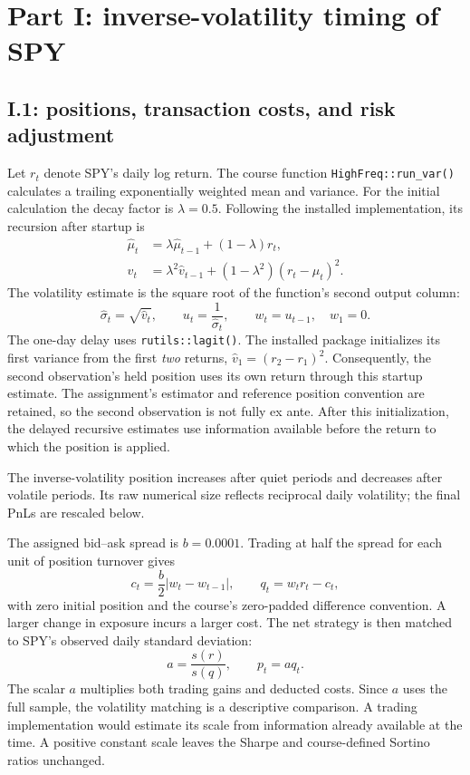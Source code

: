 \documentclass[11pt,letterpaper]{article}
\begin{document}
\section{Part I: inverse-volatility timing of SPY}
\subsection{I.1: positions, transaction costs, and risk adjustment}
Let $r_t$ denote SPY's daily log return. The course function
\texttt{HighFreq::run\_var()} calculates a trailing exponentially weighted
mean and variance. For the initial calculation the decay factor is
$\lambda=0.5$. Following the installed implementation, its recursion after
startup is
\begin{align}
\widehat\mu_t&=\lambda\widehat\mu_{t-1}+(1-\lambda)r_t,\\
\widehat v_t&=\lambda^2\widehat v_{t-1}
 +(1-\lambda^2)(r_t-\widehat\mu_t)^2.
\end{align}
The volatility estimate is the square root of the function's second output
column:
\begin{equation}
\widehat\sigma_t=\sqrt{\widehat v_t},\qquad
u_t=\frac{1}{\widehat\sigma_t},\qquad
w_t=u_{t-1},\quad w_1=0.
\label{eq:volposition}
\end{equation}
The one-day delay uses \texttt{rutils::lagit()}. The installed package
initializes its first variance from the first \emph{two} returns,
$\widehat v_1=(r_2-r_1)^2$. Consequently, the second observation's held
position uses its own return through this startup estimate. The assignment's
estimator and reference position convention are retained, so the second
observation is not fully ex ante. After this initialization, the delayed
recursive estimates use information available before the return to which
the position is applied.

The inverse-volatility position increases after quiet periods and decreases
after volatile periods. Its raw numerical size reflects reciprocal daily
volatility; the final PnLs are rescaled below.

The assigned bid--ask spread is $b=0.0001$. Trading at half the spread for
each unit of position turnover gives
\begin{equation}
c_t=\frac{b}{2}|w_t-w_{t-1}|,\qquad
q_t=w_t r_t-c_t,
\label{eq:costs}
\end{equation}
with zero initial position and the course's zero-padded difference
convention. A larger change in exposure incurs a larger cost. The net
strategy is then matched to SPY's observed daily standard deviation:
\begin{equation}
a=\frac{s(r)}{s(q)},\qquad p_t=a q_t.
\label{eq:scale}
\end{equation}
The scalar $a$ multiplies both trading gains and deducted costs. Since $a$
uses the full sample, the volatility matching is a descriptive comparison.
A trading implementation would estimate its scale from information already
available at the time. A positive constant scale leaves the Sharpe and
course-defined Sortino ratios unchanged.
\end{document}
